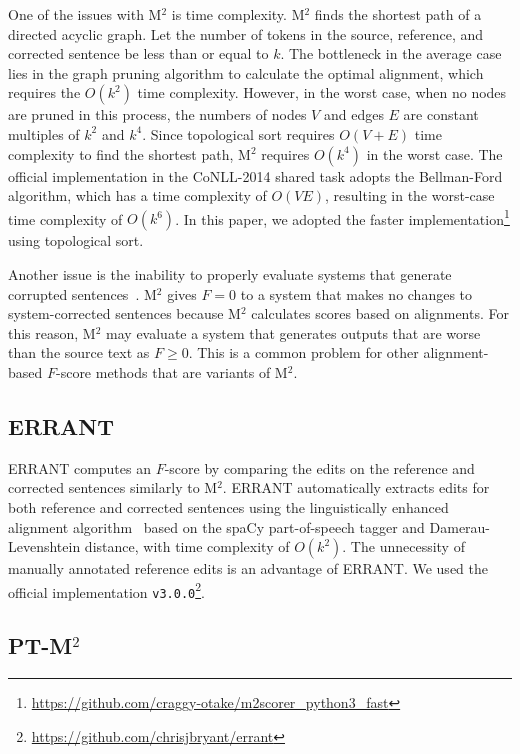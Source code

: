 \documentclass[11pt]{article}
\begin{document}
One of the issues with M${}^2$ is time complexity.
M${}^2$ finds the shortest path of a directed acyclic graph.
Let the number of tokens in the source, reference, and corrected sentence be less than or equal to $k$.
The bottleneck in the average case lies in the graph pruning algorithm to calculate the optimal alignment, which requires the $O(k^2)$ time complexity.
However, in the worst case, when no nodes are pruned in this process, the numbers of nodes $V$ and edges $E$ are constant multiples of $k^2$ and $k^4$.
Since topological sort requires $O(V + E)$ time complexity to find the shortest path, M${}^2$ requires $O(k^4)$ in the worst case.
The official implementation in the CoNLL-2014 shared task adopts the Bellman-Ford algorithm, which has a time complexity of $O(VE)$, resulting in the worst-case time complexity of $O(k^6)$. 
In this paper, we adopted the faster implementation\footnote{\url{https://github.com/craggy-otake/m2scorer_python3_fast}} using topological sort.

Another issue is the inability to properly evaluate systems that generate corrupted sentences~\citep{felice-briscoe-2015-towards}.
M${}^2$ gives $F=0$ to a system that makes no changes to system-corrected sentences because M${}^2$ calculates scores based on alignments.
For this reason, M${}^2$ may evaluate a system that generates outputs that are worse than the source text as $F \geq 0$.
This is a common problem for other alignment-based $F$-score methods that are variants of M${}^2$.

\subsection{ERRANT~\citep{bryant-etal-2017-automatic}}
\label{sec:errant}

ERRANT computes an $F$-score by comparing the edits on the reference and corrected sentences similarly to M${}^2$.
ERRANT automatically extracts edits for both reference and corrected sentences using the linguistically enhanced alignment algorithm~\citep{felice-etal-2016-automatic} based on the spaCy part-of-speech tagger and Damerau-Levenshtein distance, with time complexity of $O(k^2)$.
The unnecessity of manually annotated reference edits is an advantage of ERRANT.
We used the official implementation \texttt{v3.0.0}\footnote{\mbox{\url{https://github.com/chrisjbryant/errant}}}.

\subsection{PT-M${}^2$~\citep{gong-etal-2022-revisiting}}
\label{sec:ptm2}
\end{document}
